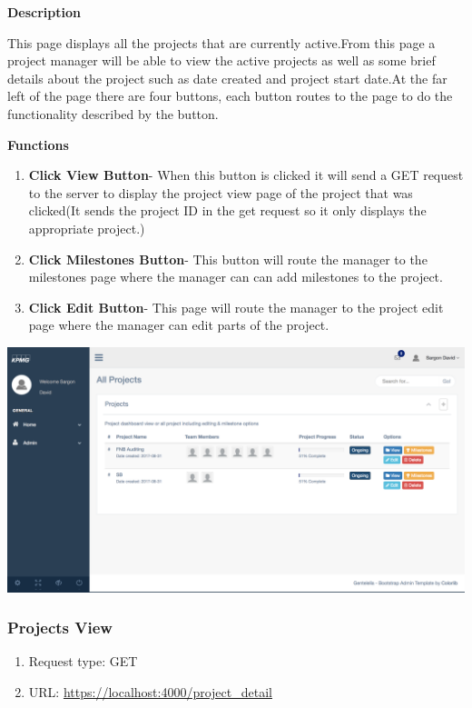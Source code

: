 \documentclass[a4paper,12pt]{article}
\begin{document}
				\textbf{Description}
				\begin{flushleft}
				    This page displays all the projects that are currently active.From this page a project manager will be able to view the active projects as well as some brief details about the project such as date created and project start date.At the far left of the page there are four buttons, each button routes to the page to do the functionality described by the button.
				\end{flushleft}
				
				\textbf{Functions}
				\begin{flushleft}
				    \begin{enumerate}
				    	\item \textbf{Click View Button}- When this button is clicked it will send a GET request to the server to display the project view page of the project that was clicked(It sends the project ID in the get request so it only displays the appropriate project.)
				 	    \item \textbf{Click Milestones Button}- This button will route the manager to the milestones page where the manager can can add milestones to the project.
				 	    \item \textbf{Click Edit Button}- This page will route the manager to the project edit page where the manager can edit parts of the project.
				     \end{enumerate}
				\end{flushleft}
        \includegraphics[width=0.99\linewidth]{Images/manager_project_dash.png}
        
        
        \subsubsection{Projects View}
		 		\begin{enumerate}
				 	\item Request type: GET
				 	\item URL: \url{https://localhost:4000/project_detail}
				 \end{enumerate}
				
\end{document}
